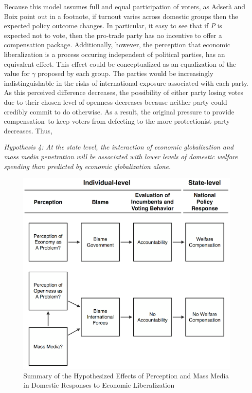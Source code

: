 \documentclass[12pt]{report}
\begin{document}
Because this model assumes full and equal participation of voters, as Adser\`{a} and Boix point out
in a footnote, if turnout varies across domestic groups then the expected policy outcome changes. In
particular, it easy to see that if \emph{P} is expected not to vote, then the pro-trade party has no
incentive to offer a compensation package. Additionally, however, the perception that economic
liberalization is a process occuring independent of political parties, has an equivalent effect.
This effect could be conceptualized as an equalization of the value for $\gamma$ proposed by each
group. The parties would be increasingly indistinguishable in the risks of international exposure
associated with each party. As this perceived difference decreases, the possibility of either party
losing votes due to their chosen level of openness decreases because neither party could credibly
commit to do otherwise. As a result, the original pressure to provide compensation--to keep voters
from defecting to the more protectionist party--decreases. Thus,

\emph{Hypothesis 4: At the state level, the interaction of economic globalization and mass media
penetration will be associated with lower levels of domestic welfare spending than predicted by
economic globalization alone.}

\begin{center}
\begin{figure}
\includegraphics{article1_flowchart}
\caption{Summary of the Hypothesized Effects of Perception and Mass Media in Domestic Responses to Economic Liberalization}
\end{figure}
\end{center}
\end{document}
